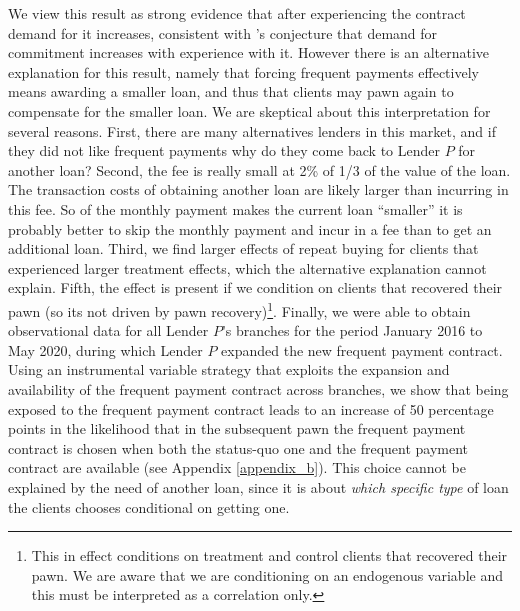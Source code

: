 \documentclass[oneside,11pt]{article}
\begin{document}
We view this result as strong evidence that after experiencing the contract demand for it increases, consistent with \cite{Alcohol}'s conjecture that demand for commitment increases with experience with it. However there is an alternative explanation for this result, namely that forcing frequent payments effectively means awarding a smaller loan, and thus that clients may pawn again to compensate for the smaller loan. We are skeptical about this interpretation for several reasons. %
First,  there are many alternatives lenders in this market, and if they did not like frequent payments why do they come back to Lender $P$ for another loan? Second, the fee is really small at 2\% of 1/3 of the value of the loan. The transaction costs of obtaining another loan are likely larger than incurring in this fee. So of the monthly payment makes the current loan ``smaller'' it is probably better to skip the monthly payment and incur in a fee than to get an additional loan. Third, we find larger effects of repeat buying for clients that experienced larger treatment effects, which the alternative explanation cannot explain. Fifth, the effect is present if we condition on clients that recovered their pawn (so its not driven by pawn recovery)\footnote{This in effect conditions on treatment and control clients that recovered their pawn. We are aware that we are conditioning on an endogenous variable and this must be interpreted as a correlation only.}. Finally, we were able to obtain observational data for all Lender $P$'s branches for the period January 2016 to May 2020, during which Lender $P$ expanded the new frequent payment contract. Using an instrumental variable strategy that exploits the expansion and availability of the frequent payment contract across branches, we show that being exposed to the frequent payment contract leads to an increase of 50 percentage points in the likelihood that in the subsequent pawn the frequent payment contract is chosen when both the status-quo one and the frequent payment contract are available  (see Appendix \ref{appendix_b}). This choice cannot be explained by the need of another loan, since it is about \textit{which specific type} of loan the clients chooses conditional on getting one.
\end{document}

